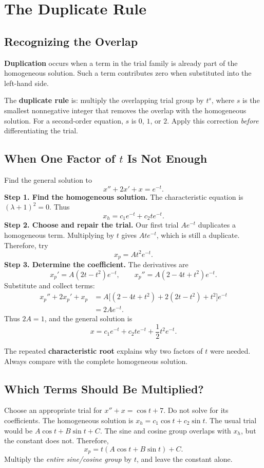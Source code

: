 \documentclass[10pt,letterpaper]{article}
\begin{document}
\section{The Duplicate Rule}
\subsection{Recognizing the Overlap}
\textbf{Duplication} occurs when a term in the trial family is already
part of the homogeneous solution. Such a term contributes zero when
substituted into the left-hand side.

The \textbf{duplicate rule} is: multiply the overlapping trial group by
$t^s$, where $s$ is the smallest nonnegative integer that removes the overlap
with the homogeneous solution. For a second-order equation, $s$ is $0$, $1$, or $2$.
Apply this correction \emph{before} differentiating the trial.

\subsection{When One Factor of $t$ Is Not Enough}
\begin{example}{Find the general solution to
\[
x''+2x'+x=e^{-t}.
\]}
\textbf{Step 1. Find the homogeneous solution.}
The characteristic equation is $(\lambda+1)^2=0$. Thus
\[
x_h=c_1e^{-t}+c_2te^{-t}.
\]
\textbf{Step 2. Choose and repair the trial.}
Our first trial $Ae^{-t}$ duplicates a homogeneous term. Multiplying by $t$
gives $Ate^{-t}$, which is still a duplicate. Therefore, try
\[
x_p=At^2e^{-t}.
\]
\textbf{Step 3. Determine the coefficient.}
The derivatives are
\[
x_p'=A(2t-t^2)e^{-t},\qquad
x_p''=A(2-4t+t^2)e^{-t}.
\]
Substitute and collect terms:
\begin{align*}
x_p''+2x_p'+x_p
 &=A\bigl[(2-4t+t^2)+2(2t-t^2)+t^2\bigr]e^{-t}\\
 &=2Ae^{-t}.
\end{align*}
Thus $2A=1$, and the general solution is
\[
\boxed{x=c_1e^{-t}+c_2te^{-t}+\frac12t^2e^{-t}.}
\]
\end{example}
The repeated \textbf{characteristic root} explains why two factors of $t$
were needed. Always compare with the complete homogeneous solution.

\subsection{Which Terms Should Be Multiplied?}
\begin{example}{Choose an appropriate trial for $x''+x=\cos t+7$.
Do not solve for its coefficients.}
The homogeneous solution is $x_h=c_1\cos t+c_2\sin t$.
The usual trial would be $A\cos t+B\sin t+C$.
The sine and cosine group overlaps with $x_h$, but the constant does not.
Therefore,
\[
\boxed{x_p=t(A\cos t+B\sin t)+C.}
\]
Multiply the \emph{entire sine/cosine group} by $t$, and leave the constant alone.
\end{example}
\end{document}
